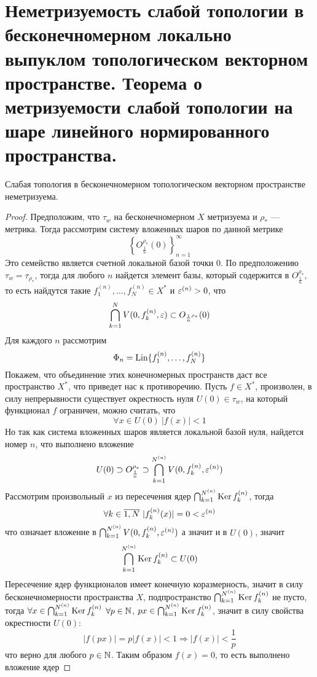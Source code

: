 \newpage
\section{Неметризуемость слабой топологии в бесконечномерном локально выпуклом топологическом векторном пространстве. Теорема о метризуемости слабой топологии на шаре линейного нормированного пространства.}
\begin{theorem}
	Слабая топология в бесконечномерном топологическом векторном пространстве неметризуема.
\end{theorem}
\begin{proof}
	Предположим, что $\tau_w$ на бесконечномерном $X$ метризуема и $\rho_*$ --- метрика. Тогда рассмотрим систему вложенных шаров по данной метрике
	$$
	\left\{O_{\frac{1}{n}}^{\rho_*}(0)\right\}_{n=1}^\infty
	$$ 
	Это семейство является счетной локальной базой точки $0$. По предположению $\tau_w  = \tau_{\rho_*}$, тогда для любого $n$ найдется элемент базы, который содержится в $O_{\frac{1}{n}}^{\rho_*}$, то есть найдутся такие $f_1^{(n)}, \dots, f_N^{(n)} \in X^*$ и $\varepsilon^{(n)}> 0$, что 
	$$
	\bigcap_{k=1}^N V(0,f_k^{(n)},\varepsilon) \subset O_{\frac{1}{n}^{\rho_*}}(0)
	$$
	Для каждого $n$ рассмотрим
	$$
	\Phi_n = \operatorname{Lin} \{f_1^{(n)}, \dots, f_N^{(n)}\}
	$$
	Покажем, что объединение этих конечномерных пространств даст все пространство $X^*$, что приведет нас к противоречию. Пусть $f \in X^*$, произволен, в силу непрерывности существует окрестность нуля $U(0) \in \tau_w$, на который функционал $f$ ограничен, можно считать, что 
	$$
	\forall x \in U(0)  \ |f(x)| < 1
	$$
	Но так как система вложенных шаров является локальной базой нуля, найдется номер $n$, что выполнено вложение
	$$
	U(0) \supset O_{\frac{1}{n}}^{\rho_*} \supset \bigcap_{k=1}^{N^{(n)}} V(0, f_k^{(n)}, \varepsilon^{(n)})
	$$
	Рассмотрим произвольный $x$ из пересечения ядер $\bigcap_{k=1}^{N^{(n)}} \operatorname{Ker} f_k^{(n)}$, тогда 
	$$
	\forall k \in \overline{1, N} \ |f_k^{(n)}(x)| = 0 < \varepsilon^{(n)} 
	$$
	что означает вложение в $\bigcap_{k=1}^{N^{(n)}} V(0, f_k^{(n)}, \varepsilon^{(n)})$ а значит и в  $U(0)$, значит 
	$$
	\bigcap_{k=1}^{N^{(n)}} \operatorname{Ker} f_k^{(n)}	\subset U(0)
	$$ 
	Пересечение ядер функционалов имеет конечную коразмерность, значит в силу бесконечномерности пространства $X$, подпространство $	\bigcap_{k=1}^{N^{(n)}} \operatorname{Ker} f_k^{(n)}$ не пусто, тогда $\forall x \in 	\bigcap_{k=1}^{N^{(n)}} \operatorname{Ker} f_k^{(n)}$ $\forall p \in \mathbb{N}$, $px \in 	\bigcap_{k=1}^{N^{(n)}} \operatorname{Ker} f_k^{(n)}$, значит в силу свойства окрестности $U(0)$: 
	$$
	|f(px)| = p|f(x)| < 1 \Rightarrow |f(x)| < \frac{1}{p}
	$$
	что верно для любого $p \in \mathbb{N}$. Таким образом $f(x) = 0$, то есть выполнено вложение ядер 

\end{proof}
